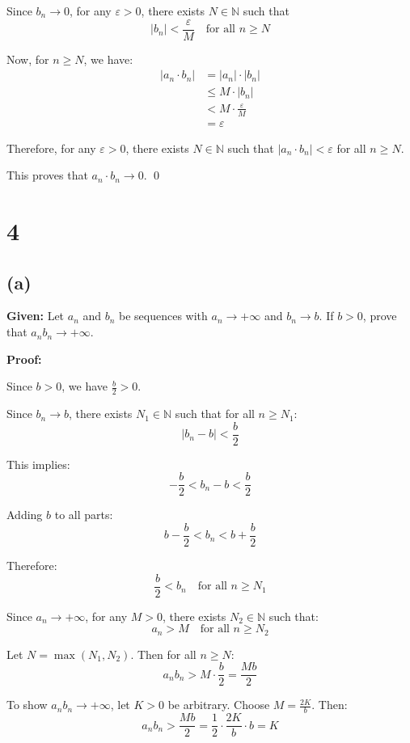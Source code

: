 \documentclass[12pt,a4paper]{article}
\theoremstyle{definition}
\theoremstyle{remark}
\begin{document}
Since $b_n \to 0$, for any $\varepsilon > 0$, there exists $N \in \mathbb{N}$ such that
$$|b_n| < \frac{\varepsilon}{M} \quad \text{for all } n \geq N$$

Now, for $n \geq N$, we have:
\begin{align}
|a_n \cdot b_n| &= |a_n| \cdot |b_n|\\
&\leq M \cdot |b_n|\\
&< M \cdot \frac{\varepsilon}{M}\\
&= \varepsilon
\end{align}

Therefore, for any $\varepsilon > 0$, there exists $N \in \mathbb{N}$ such that $|a_n \cdot b_n| < \varepsilon$ for all $n \geq N$.

This proves that $a_n \cdot b_n \to 0$. \qed


\section*{4}
\subsection*{(a)}

\textbf{Given:} Let $a_n$ and $b_n$ be sequences with $a_n \to +\infty$ and $b_n \to b$.
If $b > 0$, prove that $a_n b_n \to +\infty$.

\textbf{Proof:}

Since $b > 0$, we have $\frac{b}{2} > 0$.

Since $b_n \to b$, there exists $N_1 \in \mathbb{N}$ such that for all $n \geq N_1$:
$$|b_n - b| < \frac{b}{2}$$

This implies:
$$-\frac{b}{2} < b_n - b < \frac{b}{2}$$

Adding $b$ to all parts:
$$b - \frac{b}{2} < b_n < b + \frac{b}{2}$$

Therefore:
$$\frac{b}{2} < b_n \quad \text{for all } n \geq N_1$$

Since $a_n \to +\infty$, for any $M > 0$, there exists $N_2 \in \mathbb{N}$ such that:
$$a_n > M \quad \text{for all } n \geq N_2$$

Let $N = \max(N_1, N_2)$. Then for all $n \geq N$:
$$a_n b_n > M \cdot \frac{b}{2} = \frac{Mb}{2}$$

To show $a_n b_n \to +\infty$, let $K > 0$ be arbitrary. Choose $M = \frac{2K}{b}$. Then:
$$a_n b_n > \frac{Mb}{2} = \frac{1}{2} \cdot \frac{2K}{b} \cdot b = K$$
\end{document}
